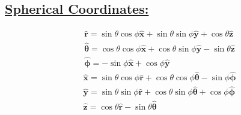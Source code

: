 \documentclass[a4paper,12pt]{article}
\begin{document}
\subsection*{\underline{Spherical Coordinates:}}
$$
    \begin{aligned}
         & \hat{\mathbf{r}}=\sin \theta \cos \phi \hat{\mathbf{x}}+\sin \theta \sin \phi \hat{\mathbf{y}}+\cos \theta \hat{\mathbf{z}}          \\
         & \hat{\boldsymbol{\theta}}=\cos \theta \cos \phi \hat{\mathbf{x}}+\cos \theta \sin \phi \hat{\mathbf{y}}-\sin \theta \hat{\mathbf{z}} \\
         & \hat{\boldsymbol{\phi}}=-\sin \phi \hat{\mathbf{x}}+\cos \phi \hat{\mathbf{y}}
    \end{aligned}
$$
$$
    \begin{aligned}
         & \hat{\mathbf{x}}=\sin \theta \cos \phi \hat{\mathbf{r}}+\cos \theta \cos \phi \hat{\boldsymbol{\theta}}-\sin \phi \hat{\boldsymbol{\phi}} \\
         & \hat{\mathbf{y}}=\sin \theta \sin \phi \hat{\mathbf{r}}+\cos \theta \sin \phi \hat{\boldsymbol{\theta}}+\cos \phi \hat{\boldsymbol{\phi}} \\
         & \hat{\mathbf{z}}=\cos \theta \hat{\mathbf{r}}-\sin \theta \hat{\boldsymbol{\theta}}
    \end{aligned}
$$
\end{document}
